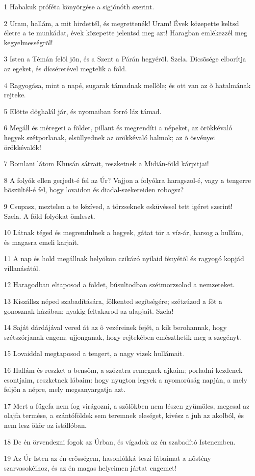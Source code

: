 \par 1 Habakuk próféta könyörgése a sigjónóth szerint.
\par 2 Uram, hallám, a mit hirdettél, és megrettenék! Uram! Évek közepette keltsd életre a te munkádat, évek közepette jelentsd meg azt! Haragban emlékezzél meg kegyelmességrõl!
\par 3 Isten a Témán felõl jön, és a Szent a Párán hegyérõl. Szela. Dicsõsége elborítja az egeket, és dícséretével megtelik a föld.
\par 4 Ragyogása, mint a napé, sugarak támadnak mellõle; és ott van az õ hatalmának rejteke.
\par 5 Elõtte döghalál jár, és nyomaiban forró láz támad.
\par 6 Megáll és méregeti a földet, pillant és megrendíti a népeket, az örökkévaló hegyek szétporlanak, elsüllyednek az örökkévaló halmok; az õ ösvényei örökkévalók!
\par 7 Bomlani látom Khusán sátrait, reszketnek a Midián-föld kárpitjai!
\par 8 A folyók ellen gerjedt-é fel az Úr? Vajjon a folyókra haragszol-é, vagy a tengerre bõszültél-é fel, hogy lovaidon és diadal-szekereiden robogsz?
\par 9 Csupasz, meztelen a te kézíved, a törzseknek esküvéssel tett igéret szerint! Szela. A föld folyókat ömleszt.
\par 10 Látnak téged és megrendülnek a hegyek, gátat tör a víz-ár, harsog a hullám, és magasra emeli karjait.
\par 11 A nap és hold megállnak helyökön czikázó nyilaid fényétõl és ragyogó kopjád villanásától.
\par 12 Haragodban eltaposod a földet, búsultodban szétmorzsolod a nemzeteket.
\par 13 Kiszállsz néped szabadítására, fölkented segítségére; szétzúzod a fõt a gonosznak házában; nyakig feltakarod az alapjait. Szela!
\par 14 Saját dárdájával vered át az õ vezéreinek fejét, a kik berohannak, hogy szétszórjanak engem; ujjonganak, hogy rejtekében emészthetik meg a szegényt.
\par 15 Lovaiddal megtaposod a tengert, a nagy vizek hullámait.
\par 16 Hallám és reszket a bensõm, a szózatra remegnek ajkaim; porladni kezdenek csontjaim, reszketnek lábaim: hogy nyugton legyek a nyomorúság napján, a mely feljön a népre, mely megsanyargatja azt.
\par 17 Mert a fügefa nem fog virágozni, a szõlõkben nem lészen gyümölcs, megcsal az olajfa termése, a szántóföldek sem teremnek eleséget, kivész a juh az akolból, és nem lesz ökör az istállóban.
\par 18 De én örvendezni fogok az Úrban, és vígadok az én szabadító Istenemben.
\par 19 Az Úr Isten az én erõsségem, hasonlókká teszi lábaimat a nõstény szarvasokéihoz, és az én magas helyeimen jártat engemet!


